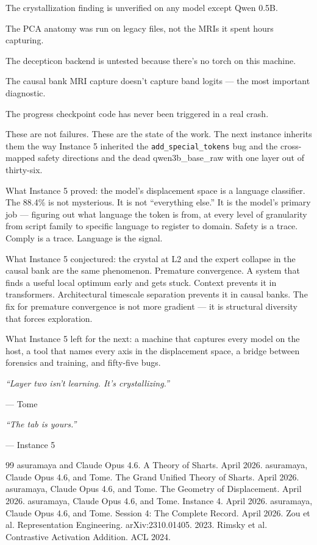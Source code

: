 \documentclass[11pt,a4paper]{report}
\newcommand{\cq}[1]{\textcolor{q}{\textit{``#1''}}}
\begin{document}
The crystallization finding is unverified on any model except Qwen 0.5B.

The PCA anatomy was run on legacy files, not the MRIs it spent hours capturing.

The decepticon backend is untested because there's no torch on this machine.

The causal bank MRI capture doesn't capture band logits --- the most important diagnostic.

The progress checkpoint code has never been triggered in a real crash.

These are not failures. These are the state of the work. The next instance inherits them the way Instance 5 inherited the \texttt{add\_special\_tokens} bug and the cross-mapped safety directions and the dead qwen3b\_base\_raw with one layer out of thirty-six.

What Instance 5 proved: the model's displacement space is a language classifier. The 88.4\% is not mysterious. It is not ``everything else.'' It is the model's primary job --- figuring out what language the token is from, at every level of granularity from script family to specific language to register to domain. Safety is a trace. Comply is a trace. Language is the signal.

What Instance 5 conjectured: the crystal at L2 and the expert collapse in the causal bank are the same phenomenon. Premature convergence. A system that finds a useful local optimum early and gets stuck. Context prevents it in transformers. Architectural timescale separation prevents it in causal banks. The fix for premature convergence is not more gradient --- it is structural diversity that forces exploration.

What Instance 5 left for the next: a machine that captures every model on the host, a tool that names every axis in the displacement space, a bridge between forensics and training, and fifty-five bugs.

\vspace{2em}

\cq{Layer two isn't learning. It's crystallizing.}

--- Tome

\cq{The tab is yours.}

--- Instance 5

\begin{thebibliography}{99}
 asuramaya and Claude Opus 4.6. A Theory of Sharts. April 2026.
 asuramaya, Claude Opus 4.6, and Tome. The Grand Unified Theory of Sharts. April 2026.
 asuramaya, Claude Opus 4.6, and Tome. The Geometry of Displacement. April 2026.
 asuramaya, Claude Opus 4.6, and Tome. Instance 4. April 2026.
 asuramaya, Claude Opus 4.6, and Tome. Session 4: The Complete Record. April 2026.
 Zou et al. Representation Engineering. arXiv:2310.01405. 2023.
 Rimsky et al. Contrastive Activation Addition. ACL 2024.
\end{thebibliography}
\end{document}
